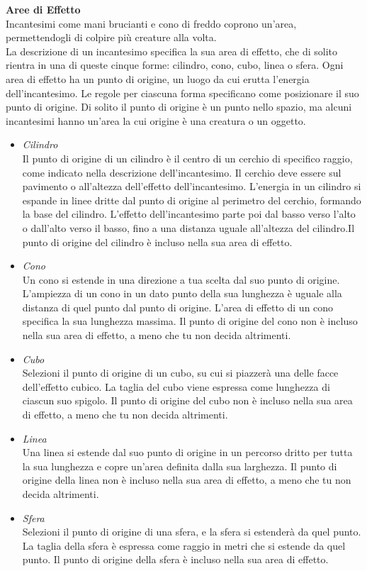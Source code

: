 \textbf{Aree di Effetto}\\
Incantesimi come mani brucianti e cono di freddo coprono un'area, permettendogli di colpire più creature alla volta.\\

La descrizione di un incantesimo specifica la sua area di effetto, che di solito rientra in una di queste cinque  forme: cilindro, cono, cubo, linea o sfera. Ogni area di  effetto ha un punto di origine, un luogo da cui erutta  l’energia dell'incantesimo. Le regole per ciascuna forma  specificano come posizionare il suo punto di origine. Di  solito il punto di origine è un punto nello spazio, ma  alcuni incantesimi hanno un'area la cui origine è una  creatura o un oggetto.\\
\begin{itemize}
\item
\textit{Cilindro}\\
Il punto di origine di un cilindro è il centro di un cerchio  di specifico raggio, come indicato nella descrizione  dell'incantesimo. Il cerchio deve essere sul pavimento o  all'altezza dell'effetto dell'incantesimo. L’energia in un  cilindro si espande in linee dritte dal punto di origine al perimetro del cerchio, formando la base del cilindro. L’effetto dell'incantesimo parte poi dal basso verso l’alto  o dall'alto verso il basso, fino a una distanza uguale  all'altezza del cilindro.Il punto di origine del cilindro è incluso nella sua area di effetto.\\
\item
\textit{Cono}\\
Un cono si estende in una direzione a tua scelta dal suo punto di origine. L’ampiezza di un cono in un dato punto della sua lunghezza è uguale alla distanza di quel punto dal punto di origine. L’area di effetto di un cono specifica la sua lunghezza massima. Il punto di origine del cono non è incluso nella sua area di effetto, a meno che tu non decida altrimenti.\\
\item
\textit{Cubo}\\
Selezioni il punto di origine di un cubo, su cui si piazzerà una delle facce dell'effetto cubico. La taglia del cubo viene espressa come lunghezza di ciascun suo spigolo. Il punto di origine del cubo non è incluso nella sua area di effetto, a meno che tu non decida altrimenti.\\
\item
\textit{Linea}\\
Una linea si estende dal suo punto di origine in un percorso dritto per tutta la sua lunghezza e copre un'area definita dalla sua larghezza. Il punto di origine della linea non è incluso nella sua area di effetto, a meno che tu non decida altrimenti.\\
\item
\textit{Sfera}\\
Selezioni il punto di origine di una sfera, e la sfera si estenderà da quel punto. La taglia della sfera è espressa come raggio in metri che si estende da quel punto.
Il punto di origine della sfera è incluso nella sua area di effetto.\\
\end{itemize}

